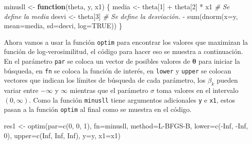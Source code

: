 \documentclass[
]{book}
\makeatletter
\newenvironment{Shaded}{\begin{snugshade}}{\end{snugshade}}
\newcommand{\AttributeTok}[1]{\textcolor[rgb]{0.77,0.63,0.00}{#1}}
\newcommand{\CommentTok}[1]{\textcolor[rgb]{0.56,0.35,0.01}{\textit{#1}}}
\newcommand{\ConstantTok}[1]{\textcolor[rgb]{0.00,0.00,0.00}{#1}}
\newcommand{\ControlFlowTok}[1]{\textcolor[rgb]{0.13,0.29,0.53}{\textbf{#1}}}
\newcommand{\DecValTok}[1]{\textcolor[rgb]{0.00,0.00,0.81}{#1}}
\newcommand{\FunctionTok}[1]{\textcolor[rgb]{0.00,0.00,0.00}{#1}}
\newcommand{\NormalTok}[1]{#1}
\newcommand{\OtherTok}[1]{\textcolor[rgb]{0.56,0.35,0.01}{#1}}
\newcommand{\SpecialCharTok}[1]{\textcolor[rgb]{0.00,0.00,0.00}{#1}}
\newcommand{\StringTok}[1]{\textcolor[rgb]{0.31,0.60,0.02}{#1}}
\newenvironment{kframe}{%
\medskip{}
\setlength{\fboxsep}{.8em}
 \def\at@end@of@kframe{}%
 \ifinner\ifhmode%
  \def\at@end@of@kframe{\end{minipage}}%
  \begin{minipage}{\columnwidth}%
 \fi\fi%
 \def\FrameCommand##1{\hskip\@totalleftmargin \hskip-\fboxsep
 \colorbox{shadecolor}{##1}\hskip-\fboxsep
     \hskip-\linewidth \hskip-\@totalleftmargin \hskip\columnwidth}%
 \MakeFramed {\advance\hsize-\width
   \@totalleftmargin\z@ \linewidth\hsize
   \@setminipage}}%
 {\par\unskip\endMakeFramed%
 \at@end@of@kframe}
\renewenvironment{Shaded}{\begin{kframe}}{\end{kframe}}
\makeatother
\begin{document}
\begin{Shaded}
\begin{Highlighting}[]
\NormalTok{minusll }\OtherTok{\textless{}{-}} \ControlFlowTok{function}\NormalTok{(theta, y, x1) \{}
\NormalTok{  media }\OtherTok{\textless{}{-}}\NormalTok{ theta[}\DecValTok{1}\NormalTok{] }\SpecialCharTok{+}\NormalTok{ theta[}\DecValTok{2}\NormalTok{] }\SpecialCharTok{*}\NormalTok{ x1  }\CommentTok{\# Se define la media}
\NormalTok{  desvi }\OtherTok{\textless{}{-}}\NormalTok{ theta[}\DecValTok{3}\NormalTok{]                  }\CommentTok{\# Se define la desviación.}
  \SpecialCharTok{{-}} \FunctionTok{sum}\NormalTok{(}\FunctionTok{dnorm}\NormalTok{(}\AttributeTok{x=}\NormalTok{y, }\AttributeTok{mean=}\NormalTok{media, }\AttributeTok{sd=}\NormalTok{desvi, }\AttributeTok{log=}\ConstantTok{TRUE}\NormalTok{))}
\NormalTok{\}}
\end{Highlighting}
\end{Shaded}

Ahora vamos a usar la función \texttt{optim} para encontrar los valores que maximizan la función de log-verosimilitud, el código para hacer eso se muestra a continuación. En el parámetro \texttt{par} se coloca un vector de posibles valores de \(\boldsymbol{\theta}\) para iniciar la búsqueda, en \texttt{fn} se coloca la función de interés, en \texttt{lower} y \texttt{upper} se colocan vectores que indican los límites de búsqueda de cada parámetro, los \(\beta_k\) pueden variar entre \(-\infty\) y \(\infty\) mientras que el parámetro \(\sigma\) toma valores en el intervalo \((0, \infty)\). Como la función \texttt{minusll} tiene argumentos adicionales \texttt{y} e \texttt{x1}, estos pasan a la función \texttt{optim} al final como se muestra en el código.

\begin{Shaded}
\begin{Highlighting}[]
\NormalTok{res1 }\OtherTok{\textless{}{-}} \FunctionTok{optim}\NormalTok{(}\AttributeTok{par=}\FunctionTok{c}\NormalTok{(}\DecValTok{0}\NormalTok{, }\DecValTok{0}\NormalTok{, }\DecValTok{1}\NormalTok{), }\AttributeTok{fn=}\NormalTok{minusll, }\AttributeTok{method=}\StringTok{\textquotesingle{}L{-}BFGS{-}B\textquotesingle{}}\NormalTok{,}
              \AttributeTok{lower=}\FunctionTok{c}\NormalTok{(}\SpecialCharTok{{-}}\ConstantTok{Inf}\NormalTok{, }\SpecialCharTok{{-}}\ConstantTok{Inf}\NormalTok{, }\DecValTok{0}\NormalTok{), }\AttributeTok{upper=}\FunctionTok{c}\NormalTok{(}\ConstantTok{Inf}\NormalTok{, }\ConstantTok{Inf}\NormalTok{, }\ConstantTok{Inf}\NormalTok{), }
              \AttributeTok{y=}\NormalTok{y, }\AttributeTok{x1=}\NormalTok{x1)}
\end{Highlighting}
\end{Shaded}
\end{document}

